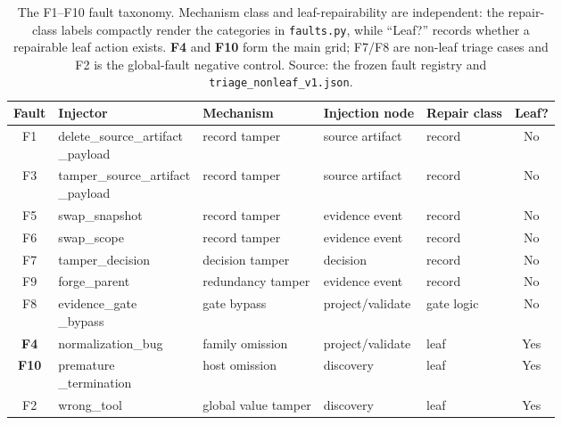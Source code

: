 \begin{table}[t]\centering\small
\caption{The F1--F10 fault taxonomy. Mechanism class and leaf-repairability are
independent: the repair-class labels compactly render the categories in
\texttt{faults.py}, while
``Leaf?'' records whether a repairable leaf action exists. \textbf{F4} and
\textbf{F10} form the main grid; F7/F8 are non-leaf triage cases and F2 is the
global-fault negative control. Source: the frozen fault registry and
\texttt{triage\_nonleaf\_v1.json}.}
\label{tab:taxonomy}
\setlength{\tabcolsep}{3.2pt}
\begin{tabular}{@{}cllllc@{}}\toprule
Fault & Injector & Mechanism & Injection node & Repair class & Leaf?\\\midrule
F1 & \shortstack[l]{delete\_source\_artifact\\\_payload}
   & record tamper & source artifact & record & No\\
F3 & \shortstack[l]{tamper\_source\_artifact\\\_payload}
   & record tamper & source artifact & record & No\\
F5 & swap\_snapshot & record tamper & evidence event & record & No\\
F6 & swap\_scope & record tamper & evidence event & record & No\\
F7 & tamper\_decision & decision tamper & decision & record & No\\
F9 & forge\_parent & redundancy tamper & evidence event & record & No\\
F8 & \shortstack[l]{evidence\_gate\\\_bypass}
   & gate bypass & project/validate & gate logic & No\\
\textbf{F4} & normalization\_bug & family omission & project/validate & leaf & Yes\\
\textbf{F10} & \shortstack[l]{premature\\\_termination}
   & host omission & discovery & leaf & Yes\\
F2 & wrong\_tool & global value tamper & discovery & leaf & Yes\\
\bottomrule
\end{tabular}
\end{table}
